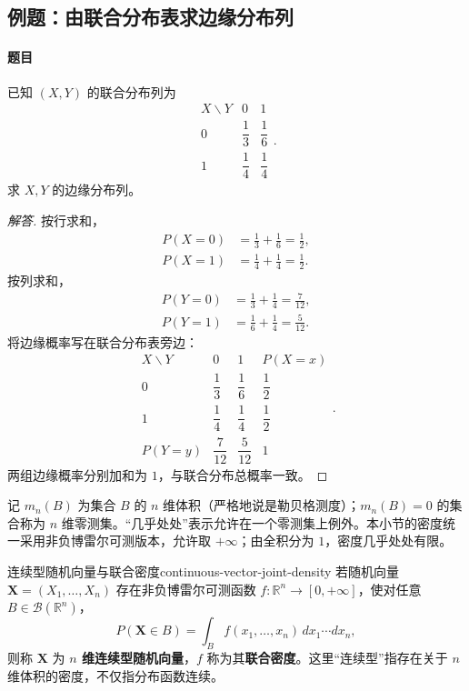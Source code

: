 \subsection{例题：由联合分布表求边缘分布列}\label{note:c3:e2}
\paragraph{题目}
已知 $(X,Y)$ 的联合分布列为
\[
\begin{array}{c|cc}
X\backslash Y&0&1\\ \hline
0&\dfrac13&\dfrac16\\[2pt]
1&\dfrac14&\dfrac14
\end{array}.
\]
求 $X,Y$ 的边缘分布列。

\begin{proof}[解答]
按行求和，
\begin{align*}
P(X=0)&=\frac13+\frac16=\frac12,\\
P(X=1)&=\frac14+\frac14=\frac12.
\end{align*}
按列求和，
\begin{align*}
P(Y=0)&=\frac13+\frac14=\frac7{12},\\
P(Y=1)&=\frac16+\frac14=\frac5{12}.
\end{align*}
将边缘概率写在联合分布表旁边：
\[
\begin{array}{c|cc|c}
X\backslash Y&0&1&P(X=x)\\ \hline
0&\dfrac13&\dfrac16&\dfrac12\\[2pt]
1&\dfrac14&\dfrac14&\dfrac12\\[2pt] \hline
P(Y=y)&\dfrac7{12}&\dfrac5{12}&1
\end{array}.
\]
两组边缘概率分别加和为 $1$，与联合分布总概率一致。
\end{proof}

记 $m_n(B)$ 为集合 $B$ 的 $n$ 维体积（严格地说是勒贝格测度）；$m_n(B)=0$ 的集合称为 $n$ 维零测集。“几乎处处”表示允许在一个零测集上例外。本小节的密度统一采用非负博雷尔可测版本，允许取 $+\infty$；由全积分为 $1$，密度几乎处处有限。

\begin{mydefinition}{连续型随机向量与联合密度}{continuous-vector-joint-density}
若随机向量 $\boldsymbol X=(X_1,\ldots,X_n)$ 存在非负博雷尔可测函数 $f:\mathbb R^n\to[0,+\infty]$，使对任意 $B\in\mathcal B(\mathbb R^n)$，
\[
P(\boldsymbol X\in B)=\int_B f(x_1,\ldots,x_n)\,dx_1\cdots dx_n,
\]
则称 $\boldsymbol X$ 为 \textbf{$n$ 维连续型随机向量}，$f$ 称为其\textbf{联合密度}。这里“连续型”指存在关于 $n$ 维体积的密度，不仅指分布函数连续。
\end{mydefinition}

